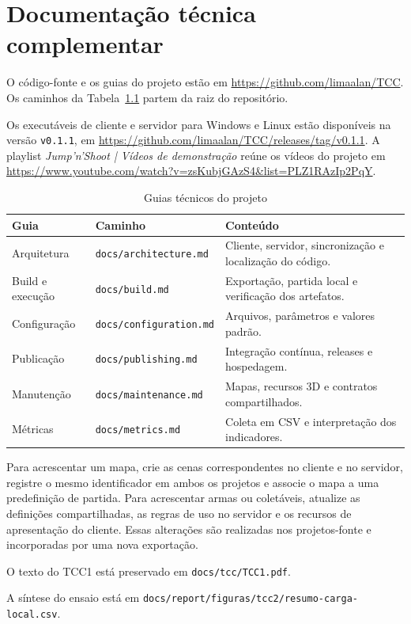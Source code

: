 \chapter{Documentação técnica complementar}\label{ap:fontes-tecnicas}

O código-fonte e os guias do projeto estão em \url{https://github.com/limaalan/TCC}. Os caminhos da Tabela~\ref{tab:fontes-tecnicas} partem da raiz do repositório.

Os executáveis de cliente e servidor para Windows e Linux estão disponíveis na versão \texttt{v0.1.1}, em \url{https://github.com/limaalan/TCC/releases/tag/v0.1.1}. A playlist \textit{Jump'n'Shoot | Vídeos de demonstração} reúne os vídeos do projeto em \url{https://www.youtube.com/watch?v=zsKubjGAzS4&list=PLZ1RAzIp2PqY}.

\begin{table}[htbp]
\centering
\caption{Guias técnicos do projeto}\label{tab:fontes-tecnicas}
\begingroup
\small
\setlength{\tabcolsep}{4pt}
\renewcommand{\arraystretch}{1.18}
\begin{tabular}{>{\raggedright\arraybackslash}p{}>{\raggedright\arraybackslash}p{}>{\raggedright\arraybackslash}p{}}
\toprule
Guia & Caminho & Conteúdo \\
\midrule
Arquitetura & \nolinkurl{docs/architecture.md} & Cliente, servidor, sincronização e localização do código. \\
Build e execução & \nolinkurl{docs/build.md} & Exportação, partida local e verificação dos artefatos. \\
Configuração & \nolinkurl{docs/configuration.md} & Arquivos, parâmetros e valores padrão. \\
Publicação & \nolinkurl{docs/publishing.md} & Integração contínua, releases e hospedagem. \\
Manutenção & \nolinkurl{docs/maintenance.md} & Mapas, recursos 3D e contratos compartilhados. \\
Métricas & \nolinkurl{docs/metrics.md} & Coleta em CSV e interpretação dos indicadores. \\
\bottomrule
\end{tabular}
\endgroup
{}
\end{table}

Para acrescentar um mapa, crie as cenas correspondentes no cliente e no servidor, registre o mesmo identificador em ambos os projetos e associe o mapa a uma predefinição de partida. Para acrescentar armas ou coletáveis, atualize as definições compartilhadas, as regras de uso no servidor e os recursos de apresentação do cliente. Essas alterações são realizadas nos projetos-fonte e incorporadas por uma nova exportação.

O texto do TCC1 está preservado em \nolinkurl{docs/tcc/TCC1.pdf}.

A síntese do ensaio está em \mbox{\nolinkurl{docs/report/figuras/tcc2/resumo-carga-local.csv}}.
